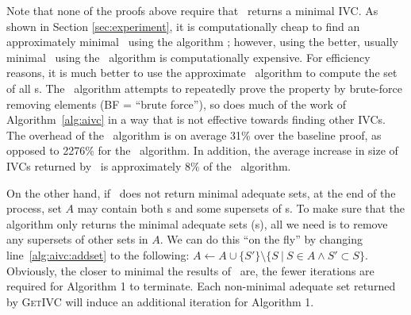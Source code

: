 \begin{IEEEproof}
%
%
%
\end{IEEEproof}

Note that none of the proofs above require that \getivc\ returns a minimal IVC.
As shown in Section \ref{sec:experiment}, it is computationally cheap to find an
approximately minimal \ivc\ using the algorithm \ucalg; however, using the better,
usually minimal \ivc\ using the \ucbfalg\ algorithm is computationally expensive.  For efficiency
reasons, it is much better to use the approximate \ucalg\ algorithm to compute the set of
all \mivc s.  The \ucbfalg\ algorithm attempts to repeatedly prove the property by brute-force removing elements (BF = ``brute force''), so does much of the work of Algorithm~\ref{alg:aivc} in a way that is not effective towards finding other IVCs.  The overhead of the \ucalg\ algorithm is on average 31\% over the baseline proof, as opposed to 2276\% for the \ucbfalg\ algorithm.  In addition, the average increase in size of IVCs returned by \ucalg\ is approximately 8\% of the \ucbfalg\ algorithm.

On the other hand, if \getivc ~does not return minimal adequate sets, at the end of the process,
set $A$ may contain both \mivc s and some supersets of \mivc s. To make sure that the algorithm only returns
the minimal adequate sets (\mivc s), all we need is to remove any supersets of other sets in $A$.  We can do this ``on the fly'' by changing
line~\ref{alg:aivc:addset} to the following:
$A \leftarrow A \cup \{S'\} \setminus \{ S~|~S \in A \wedge S' \subset S \}$.
Obviously, the closer to minimal the results of \getivc ~are,
the fewer iterations are required for Algorithm 1 to terminate.  Each non-minimal adequate set returned by \textsc{GetIVC} will induce an additional iteration for Algorithm 1.



%




